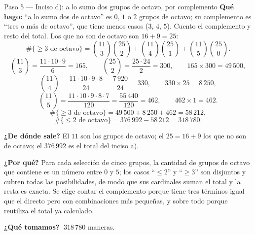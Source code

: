 \documentclass[11pt]{article}
\begin{document}
\begin{paso}{Paso 5 --- Inciso d): a lo sumo dos grupos de octavo, por complemento}
\textbf{Qué hago:} ``a lo sumo dos de octavo'' es $0$, $1$ o $2$ grupos de octavo; su complemento es ``tres
o más de octavo'', que tiene menos casos ($3$, $4$, $5$). Cuento el complemento y resto del total. Los que
no son de octavo son $16+9=25$:
\[
\#\{\geq3\text{ de octavo}\}=\binom{11}{3}\binom{25}{2}+\binom{11}{4}\binom{25}{1}+\binom{11}{5}\binom{25}{0} .
\]
\[
\binom{11}{3}=\frac{11\cdot10\cdot9}{6}=165,\qquad \binom{25}{2}=\frac{25\cdot24}{2}=300,\qquad 165\times300=49\,500,
\]
\[
\binom{11}{4}=\frac{11\cdot10\cdot9\cdot8}{24}=\frac{7\,920}{24}=330,\qquad 330\times25=8\,250,
\]
\[
\binom{11}{5}=\frac{11\cdot10\cdot9\cdot8\cdot7}{120}=\frac{55\,440}{120}=462,\qquad 462\times1=462 .
\]
\[
\#\{\geq3\text{ de octavo}\}=49\,500+8\,250+462=58\,212 ,
\]
\[
\#\{\leq2\text{ de octavo}\}=376\,992-58\,212=318\,780 .
\]

\textbf{¿De dónde sale?} El $11$ son los grupos de octavo; el $25=16+9$ los que no son de octavo; el
$376\,992$ es el total del inciso a).

\textbf{¿Por qué?} Para cada selección de cinco grupos, la cantidad de grupos de octavo que contiene es un
número entre $0$ y $5$; los casos ``$\leq2$'' y ``$\geq3$'' son disjuntos y cubren todas las posibilidades,
de modo que sus cardinales suman el total y la resta es exacta. Se elige contar el complemento porque tiene
tres términos igual que el directo pero con combinaciones más pequeñas, y sobre todo porque reutiliza el
total ya calculado.

\textbf{¿Qué tomamos?} $\;318\,780$ maneras.
\end{paso}
\end{document}
